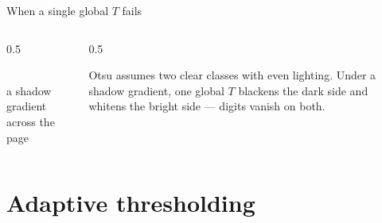 \documentclass[10pt,aspectratio=169]{beamer}
\begin{document}
\begin{frame}{When a single global $T$ fails}
  \begin{columns}[T]
    \begin{column}{0.5\textwidth}
      \begin{center}
      \\{\scriptsize a shadow gradient across the page}
      \end{center}
    \end{column}
    \begin{column}{0.5\textwidth}
      \begin{badbox}
        Otsu assumes two clear classes with even lighting. Under a shadow gradient, one global $T$
        blackens the dark side and whitens the bright side — digits vanish on both.
      \end{badbox}
    \end{column}
  \end{columns}
\end{frame}

\section{Adaptive thresholding}
\end{document}
